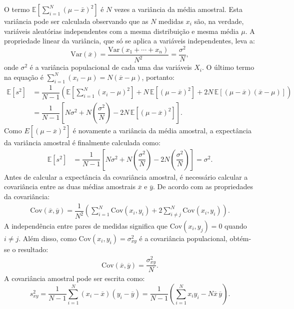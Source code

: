 O termo $\mathbb{E}[\textstyle\sum_{i=1}^{N} (\mu - \bar{x})^2]$ é $N$ vezes a variância da média amostral. Esta variância pode ser calculada observando que as $N$ medidas $x_i$ são, na verdade, variáveis aleatórias independentes com a mesma distribuição e mesma média $\mu$. A propriedade linear da variância, que só se aplica a variáveis independentes, leva a:
\begin{equation}\label{2.25}
\text{Var}(\overline{x}) = \dfrac{\text{Var}(x_1 + \cdots + x_n)}{N^2} = \frac{\sigma^2}{N},
\end{equation}
onde $\sigma^2$ é a variância populacional de cada uma das variáveis $X_i$. O último termo na equação é $\textstyle\sum_{i=1}^{N} (x_i - \mu) = N (\overline{x} - \mu)$, portanto:
\begin{align*}
\mathbb{E}[s^2] &= \dfrac{1}{N -1}\left(\mathbb{E}\left[\sum_{i=1}^N(x_i - \mu)^2\right] + N\,\mathbb{E}\left[(\mu - \overline{x})^2\right] + 2N\,\mathbb{E}\left[(\mu - \overline{x})(\overline{x} - \mu)\right]\right) \\
&= \dfrac{1}{N -1}\left[N\sigma^2 + N\left(\dfrac{\sigma^2}{N}\right) - 2N\,\mathbb{E}\left[(\mu - \overline{x})^2\right]\right].
\end{align*}
Como $E[(\mu - \overline{x})^2]$ é novamente a variância da média amostral, a expectância da variância amostral é finalmente calculada como:
\begin{align*}
	\mathbb{E}[s^2] &= \dfrac{1}{N -1}\left[N\sigma^2 + N\left(\dfrac{\sigma^2}{N}\right) - 2N\left(\dfrac{\sigma^2}{N}\right)\right] = \sigma^2.
\end{align*}
Antes de calcular a expectância da covariância amostral, é necessário calcular a covariância entre as duas médias amostrais $\overline x$ e $\overline y$. De acordo com as propriedades da covariância:
\begin{align*}
 \text{Cov}(\overline x, \overline y) = \dfrac{1}{N^2}\left(\sum_{i=1}^{N}\text{Cov}(x_i,y_i) + 2 \sum_{i\neq j}^{N}\text{Cov}(x_i,y_i)\right).
\end{align*}
A independência entre pares de medidas significa que $\text{Cov}(x_i, y_j) = 0$ quando $i \neq j$. Além disso, como $\text{Cov}(x_i, y_i) = \sigma_{xy}^2$ é a covariância populacional, obtém-se o resultado:
\begin{align*}
\text{Cov}(\overline{x},\overline{y}) = \dfrac{\sigma_{xy}^2}{N}.
\end{align*}
A covariância amostral pode ser escrita como:
\begin{equation*}
s_{xy}^2 = \dfrac{1}{N-1}\sum_{i=1}^{N}(x_i - \overline{x})(y_i - \overline{y}) = \dfrac{1}{N-1} \left( \sum_{i=1}^{N} x_i y_i - N\overline{x}\,\overline{y}\right).
\end{equation*}
